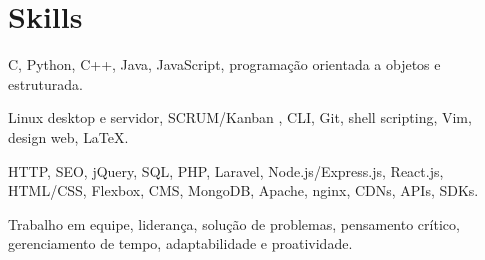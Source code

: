 \section{Skills}
{C, Python, C++, Java, JavaScript, programação orientada a objetos e estruturada.}

{Linux desktop e servidor, SCRUM/Kanban , CLI, Git, shell scripting, Vim, design web, {\LaTeX}.}

{HTTP, SEO, jQuery, SQL, PHP, Laravel, Node.js/Express.js, React.js, HTML/CSS, Flexbox, CMS, MongoDB, Apache, nginx, CDNs, APIs, SDKs.}

{Trabalho em equipe, liderança, solução de problemas, pensamento crítico, gerenciamento de tempo, adaptabilidade e proatividade.}
